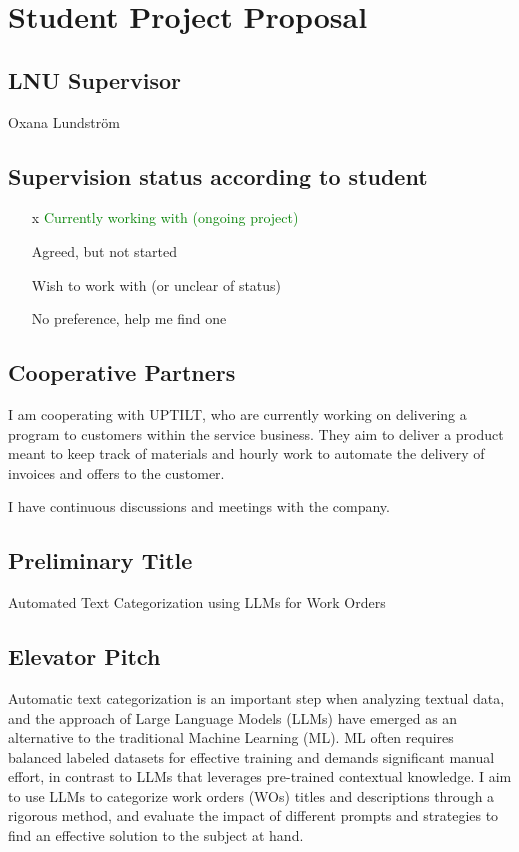 \section{Student Project Proposal}

\subsection{LNU Supervisor}
Oxana Lundström

\subsection{Supervision status according to student}

\begin{itemize}
    \item[x] \textcolor{green}{Currently working with (ongoing project)}

    \item[ ] Agreed, but not started

    \item[ ] Wish to work with (or unclear of status)

    \item[ ] No preference, help me find one
\end{itemize}

\subsection{Cooperative Partners}

I am cooperating with UPTILT, who are currently working on delivering a program
to customers within the service business. They aim to deliver a product meant to
keep track of materials and hourly work to automate the delivery of invoices and
offers to the customer.

I have continuous discussions and meetings with the company.

\subsection{Preliminary Title}

Automated Text Categorization using LLMs for Work Orders

\subsection{Elevator Pitch}

Automatic text categorization is an important step when analyzing textual data, and
the approach of Large Language Models (LLMs) have emerged as an alternative to the
traditional Machine Learning (ML). ML often requires balanced labeled datasets
for effective training and demands significant manual effort, in contrast to LLMs
that leverages pre-trained contextual knowledge. I aim to use LLMs to categorize
work orders (WOs) titles and descriptions through a rigorous method, and evaluate
the impact of different prompts and strategies to find an effective solution to the
subject at hand.

